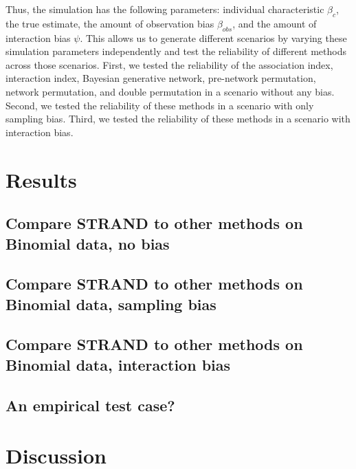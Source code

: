 \documentclass[Afour,sageh,times]{sagej}
\begin{document}
Thus, the simulation has the following parameters: individual characteristic $\beta_{c}$, the true estimate, the amount of observation bias $\beta_{obs}$, and the amount of interaction bias $\psi$. This allows us to generate different scenarios by varying these simulation parameters independently and test the reliability of different methods across those scenarios. First, we tested the reliability of the association index, interaction index, Bayesian generative network, pre-network permutation, network permutation, and double permutation in a scenario without any bias.  Second, we tested the reliability of these methods in a scenario with only sampling bias. Third, we tested the reliability of these methods in a scenario with interaction bias.

\section{Results}
\subsection{Compare STRAND to other methods on Binomial data, no bias}

\subsection{Compare STRAND to other methods on Binomial data, sampling bias}

\subsection{Compare STRAND to other methods on Binomial data, interaction bias}

\subsection{An empirical test case?}

\section{Discussion}







\end{document}
